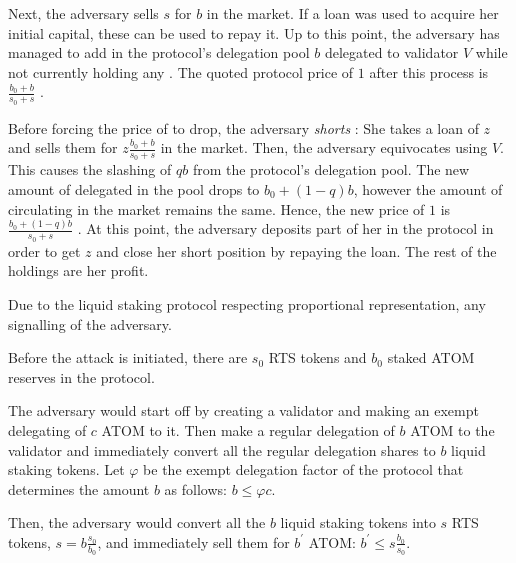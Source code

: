 Next, the adversary sells $s$ \stasset for $b$ \asset in the market.
If a loan was used to acquire her initial capital,
these \asset can be used to repay it.
Up to this point, the adversary
has managed to add in the protocol's delegation pool $b$
\asset delegated to validator $V$ while not currently holding
any \stasset. The quoted protocol price of $1$ \stasset after this process
is $\frac{b_0 + b}{s_0 + s}$ \asset.

Before forcing the price of \stasset to drop, the adversary \emph{shorts}
\stasset: She takes a loan of $z$ \stasset and sells them for
$z \frac{b_0 + b}{s_0 + s}$ \asset in the market.
Then, the adversary equivocates using $V$. This causes the
slashing of $qb$ \asset from the protocol's delegation pool. The new
amount of delegated \asset in the pool drops to $b_0 + (1 - q) b$, however
the amount of \stasset circulating in the market remains the same. Hence,
the new price of $1$ \stasset is $\frac{b_0 + (1 - q) b}{s_0 + s}$ \asset.
At this point, the adversary deposits part of her \asset in the protocol
in order to get $z$ \stasset and close her short position by repaying the loan.
The rest of the \asset holdings are her profit.


Due to the liquid staking protocol respecting proportional
representation, any signalling of the adversary.

Before the attack is initiated, there are $s_0$ RTS tokens and $b_0$
staked ATOM reserves in the protocol.

The adversary would start off by creating a validator and making an
exempt delegating of $c$ ATOM to it.
Then make a regular delegation of $b$ ATOM to the validator and
immediately convert all the regular delegation shares to $b$ liquid
staking tokens.
Let $\varphi$ be the exempt delegation factor of the protocol
that determines the amount $b$ as follows: $b \leq \varphi c$.

Then, the adversary would convert all the $b$ liquid staking tokens into
$s$ RTS tokens, $s = b \frac{s_0}{b_0}$, and immediately sell them for
$b^{'}$ ATOM: $b^{'} \leq s \frac{b_0}{s_0}$.

